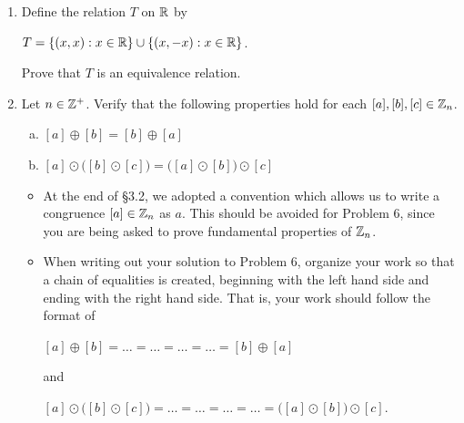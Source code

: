 \documentclass[11pt,fleqn,dvipsnames,usenames]{article}
\begin{document}
\begin{enumerate}
\item Define the relation $T$ on $\mathbb{R}$ by
\begin{center}
$T = \left\{(x,x): x\in\mathbb{R}\right\}\cup \left\{(x,-x): x\in\mathbb{R}\right\}$.
\end{center}
Prove that $T$ is an equivalence relation.

\item Let $n\in\mathbb{Z}^{+}$.  Verify that the following properties hold for each $[a],[b],[c]\in\mathbb{Z}_n$.
\vsmsp

\begin{enumerate}[(a)]
\item $[a] \oplus [b] = [b]\oplus [a]$
\item $[a] \odot \big([b] \odot [c]\big) = \big([a] \odot [b]\big)\odot [c]$
\end{enumerate}

\notes
\begin{itemize}
\item At the end of \S3.2, we adopted a convention which allows us to write a congruence $[a]\in\mathbb{Z}_n$ as $a$.  This should be avoided for Problem 6, since you are being asked to prove fundamental properties of $\mathbb{Z}_n$.
\item When writing out your solution to Problem 6, organize your work so that a chain of equalities is created, beginning with the left hand side and ending with the right hand side.  That is, your work should follow the format of
\begin{center}
$[a]\oplus [b] = \ldots = \ldots = \ldots = \ldots = [b] \oplus [a]$
\end{center}
and
\begin{center}
$[a] \odot \big([b] \odot [c]\big) = \ldots = \ldots = \ldots = \ldots = \big([a] \odot [b]\big)\odot [c]$.
\end{center}
\end{itemize}
\end{enumerate}
\end{document}

